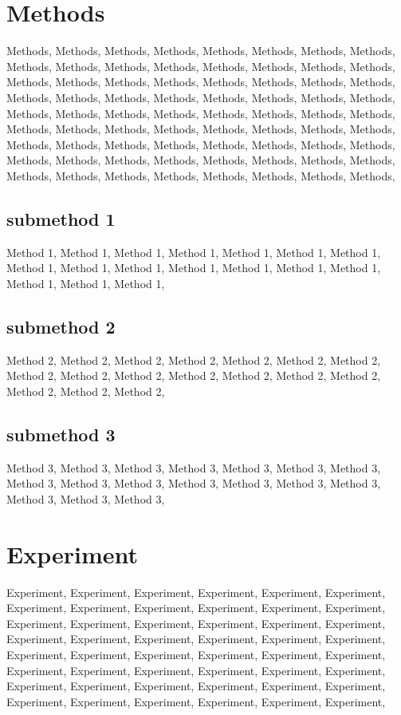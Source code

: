 \documentclass[a4paper]{article}
\begin{document}
\section{Methods} %
\label{sec:Methods}
Methods, Methods, Methods, Methods, Methods, Methods, Methods, Methods, Methods, Methods, Methods, Methods, Methods, Methods, Methods, Methods, Methods, Methods, Methods, Methods, Methods, Methods, Methods, Methods, Methods, Methods, Methods, Methods, Methods, Methods, Methods, Methods, Methods, Methods, Methods, Methods, Methods, Methods, Methods, Methods, Methods, Methods, Methods, Methods, Methods, Methods, Methods, Methods, Methods, Methods, Methods, Methods, Methods, Methods, Methods, Methods, Methods, Methods, Methods, Methods, Methods, Methods, Methods, Methods, Methods, Methods, Methods, Methods, Methods, Methods, Methods, Methods, 

\subsection{submethod 1}
Method 1, Method 1, Method 1, Method 1, Method 1, Method 1, Method 1, Method 1, Method 1, Method 1, Method 1, Method 1, Method 1, Method 1, Method 1, Method 1, Method 1, 

\subsection{submethod 2}
Method 2, Method 2, Method 2, Method 2, Method 2, Method 2, Method 2, Method 2, Method 2, Method 2, Method 2, Method 2, Method 2, Method 2, Method 2, Method 2, Method 2, 

\subsection{submethod 3}
Method 3, Method 3, Method 3, Method 3, Method 3, Method 3, Method 3, Method 3, Method 3, Method 3, Method 3, Method 3, Method 3, Method 3, Method 3, Method 3, Method 3, 

\section{Experiment} %
\label{Experiment}

Experiment, Experiment, Experiment, Experiment, Experiment, Experiment, Experiment, Experiment, Experiment, Experiment, Experiment, Experiment, Experiment, Experiment, Experiment, Experiment, Experiment, Experiment, Experiment, Experiment, Experiment, Experiment, Experiment, Experiment, Experiment, Experiment, Experiment, Experiment, Experiment, Experiment, Experiment, Experiment, Experiment, Experiment, Experiment, Experiment, Experiment, Experiment, Experiment, Experiment, Experiment, Experiment, Experiment, Experiment, Experiment, Experiment, Experiment, Experiment, 
\end{document}
